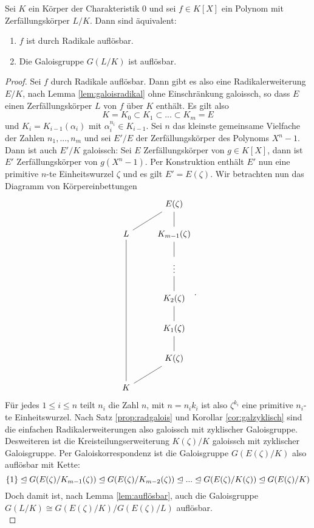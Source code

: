 \documentclass{book}
\begin{document}
\begin{thm}
    \label{thm:main}
    Sei $K$ ein Körper der Charakteristik $0$ und sei $f \in K[X]$ ein Polynom
    mit Zerfällungskörper $L/K$. Dann sind äquivalent:
    \begin{enumerate}[label= (\roman *)]
        \item $f$ ist durch Radikale auflösbar. 
        \item Die Galoisgruppe $G(L/K)$ ist auflösbar. 
    \end{enumerate}
\end{thm}
\begin{proof}
    Sei $f$ durch Radikale auflösbar. Dann gibt es also eine Radikalerweiterung $E/K$, nach 
    Lemma \ref{lem:galoisradikal} ohne Einschränkung galoissch, so dass $E$
    einen Zerfällungskörper $L$ von $f$ über $K$ enthält. Es gilt also 
    \[
        K = K_0 \subset K_1 \subset ... \subset K_m = E
    \]
    und $K_i = K_{i-1}(\alpha_i)$ mit $\alpha_i^{n_i} \in K_{i-1}$. Sei $n$ das
    kleinste gemeinsame Vielfache der Zahlen $n_1, ..., n_m$ und sei $E'/E$ der
    Zerfällungskörper des Polynoms $X^n - 1$. Dann ist auch $E'/K$ galoissch:
    Sei $E$ Zerfällungskörper von $g \in K[X]$, dann ist $E'$ Zerfällungskörper
    von $g (X^n -1)$. Per Konstruktion enthält $E'$ nun eine primitive $n$-te
    Einheitswurzel $\zeta$ und es gilt $E' = E(\zeta)$. Wir betrachten nun das Diagramm von Körpereinbettungen
    \[
    \begin{tikzcd}
        & E(\zeta)\\
     L\ar[dash]{ur}    & K_{m-1}(\zeta) \ar[dash]{u}\\
                &  \vdots\ar[dash]{u}\\
                & K_2(\zeta) \ar[dash]{u}\\
                & K_1(\zeta) \ar[dash]{u}\\
     &  K(\zeta) \ar[dash]{u}\\
    K \ar[dash]{ur}\ar[dash]{uuuuu} & 
    \end{tikzcd}.
    \]
    Für jedes $1 \le i \le n$ teilt $n_i$ die Zahl $n$, mit $n = n_i k_i$ ist
    also $\zeta^{k_i}$ eine primitive $n_i$-te Einheitswurzel. Nach Satz
    \ref{prop:radgalois} und Korollar \ref{cor:galzyklisch} sind die einfachen
    Radikalerweiterungen also galoissch mit zyklischer Galoisgruppe.
    Desweiteren ist die Kreisteilungserweiterung $K(\zeta)/K$ galoissch mit
    zyklischer Galoisgruppe. Per Galoiskorrespondenz ist die Galoisgruppe
    $G(E(\zeta)/K)$ also auflösbar mit Kette:
    \[
        \{1\} \trianglelefteq G(E(\zeta)/K_{m-1}(\zeta)) \trianglelefteq G(E(\zeta)/K_{m-2}(\zeta)) \trianglelefteq ... \trianglelefteq G(E(\zeta)/K(\zeta)) \trianglelefteq G(E(\zeta)/K)
    \]
    Doch damit ist, nach Lemma \ref{lem:auflösbar}, auch die Galoisgruppe
    $G(L/K) \cong G(E(\zeta)/K)/G(E(\zeta)/L)$ auflösbar.\\


\end{proof}
\end{document}
